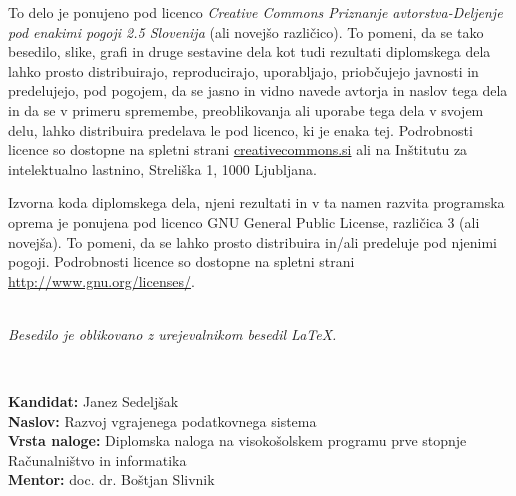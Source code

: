 \documentclass[a4paper,12pt,openright]{book}
\newcommand{\clearemptydoublepage}{\newpage{\pagestyle{empty}\cleardoublepage}}
\newcommand{\CcImageCc}[1]{%
	\texttt{[image: cc\_cc\_30.pdf]}%
}
\newcommand{\CcImageBy}[1]{%
	\texttt{[image: cc\_by\_30.pdf]}%
}
\newcommand{\CcImageSa}[1]{%
	\texttt{[image: cc\_sa\_30.pdf]}%
}
\begin{document}
\newpage
\thispagestyle{empty}

\vspace*{5cm}
{\small \noindent
To delo je ponujeno pod licenco \textit{Creative Commons Priznanje avtorstva-Deljenje pod enakimi pogoji 2.5 Slovenija} (ali novej\v so razli\v cico).
To pomeni, da se tako besedilo, slike, grafi in druge sestavine dela kot tudi rezultati diplomskega dela lahko prosto distribuirajo,
reproducirajo, uporabljajo, priobčujejo javnosti in predelujejo, pod pogojem, da se jasno in vidno navede avtorja in naslov tega
dela in da se v primeru spremembe, preoblikovanja ali uporabe tega dela v svojem delu, lahko distribuira predelava le pod
licenco, ki je enaka tej.
Podrobnosti licence so dostopne na spletni strani \href{http://creativecommons.si}{creativecommons.si} ali na Inštitutu za
intelektualno lastnino, Streliška 1, 1000 Ljubljana.

\vspace*{1cm}
\begin{center}%
\end{center}
}

\vspace*{1cm}
{\small \noindent
Izvorna koda diplomskega dela, njeni rezultati in v ta namen razvita programska oprema je ponujena pod licenco GNU General Public License,
različica 3 (ali novejša). To pomeni, da se lahko prosto distribuira in/ali predeluje pod njenimi pogoji.
Podrobnosti licence so dostopne na spletni strani \url{http://www.gnu.org/licenses/}.
}

\vfill
\begin{center} 
\ \\ \vfill
{\em
Besedilo je oblikovano z urejevalnikom besedil \LaTeX.}
\end{center}

\clearemptydoublepage

\thispagestyle{empty}
\
\vfill

\bigskip
\noindent\textbf{Kandidat:} Janez Sedeljšak\\
\noindent\textbf{Naslov:} Razvoj vgrajenega podatkovnega sistema\\
\noindent\textbf{Vrsta naloge:} Diplomska naloga na visokošolskem programu prve stopnje Računalništvo in informatika \\
\noindent\textbf{Mentor:} doc. dr. Boštjan Slivnik\\
\end{document}
